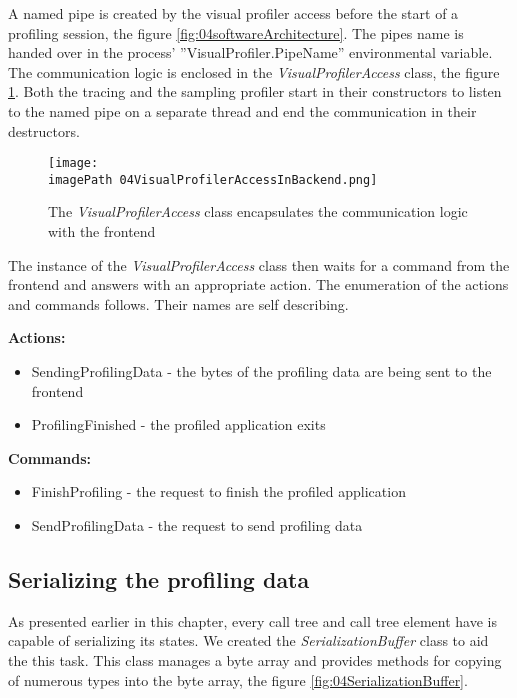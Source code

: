 A named pipe is created by the visual profiler access before the start of a profiling session, the figure \ref{fig:04softwareArchitecture}. The pipes name is handed over in the process' ''VisualProfiler.PipeName'' environmental variable. The communication logic is enclosed in the \textit{VisualProfilerAccess} class, the figure \ref{fig:04VisualProfilerAccessInBackend}. Both the tracing and the sampling profiler start in their constructors to listen to the named pipe on a separate thread and end the communication in their destructors.

\begin{figure}
	\centering
		\texttt{[image: \\imagePath 04VisualProfilerAccessInBackend.png]}
		\caption{The \textit{VisualProfilerAccess} class encapsulates the communication logic with the frontend}
	\label{fig:04VisualProfilerAccessInBackend}
\end{figure}

The instance of the \textit{VisualProfilerAccess} class then waits for a command from the frontend and answers with an appropriate action. The enumeration of the actions and commands follows. Their names are self describing.

\textbf{Actions:}
\begin{itemize}	
\item	SendingProfilingData - the bytes of the profiling data are being sent to the frontend
\item	ProfilingFinished - the profiled application exits
\end{itemize}

\textbf{Commands:}
\begin{itemize}	
\item	FinishProfiling - the request to finish the profiled application
\item	SendProfilingData - the request to send profiling data
\end{itemize}

\subsection{Serializing the profiling data}
As presented earlier in this chapter, every call tree and call tree element have is capable of serializing its states. We created the \textit{SerializationBuffer} class to aid the this task. This class manages a byte array and provides methods for copying of numerous types into the byte array, the figure \ref{fig:04SerializationBuffer}.

